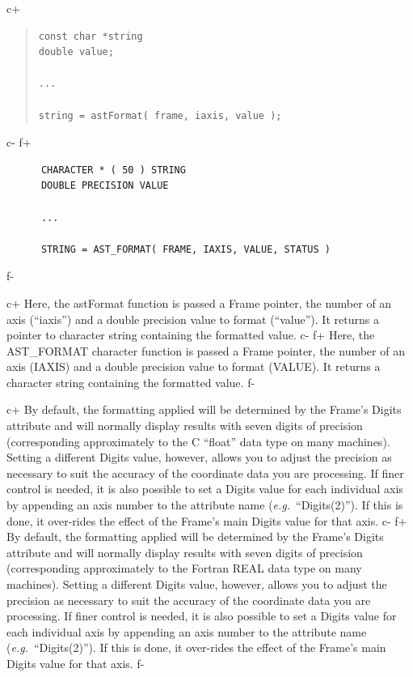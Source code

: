 \documentclass[twoside,11pt]{article}
\begin{document}
c+
\begin{quote}
\small
\begin{verbatim}
const char *string
double value;

...

string = astFormat( frame, iaxis, value );
\end{verbatim}
\normalsize
\end{quote}
c-
f+
\small
\begin{verbatim}
      CHARACTER * ( 50 ) STRING
      DOUBLE PRECISION VALUE

      ...

      STRING = AST_FORMAT( FRAME, IAXIS, VALUE, STATUS )
\end{verbatim}
\normalsize
f-

c+
Here, the astFormat function is passed a Frame pointer, the number of
an axis (``iaxis'') and a double precision value to format
(``value''). It returns a pointer to character string containing the
formatted value.
c-
f+
Here, the AST\_FORMAT character function is passed a Frame pointer,
the number of an axis (IAXIS) and a double precision value to format
(VALUE). It returns a character string containing the formatted value.
f-
\label{ss:formattingwithdigits}

c+
By default, the formatting applied will be determined by the Frame's
Digits attribute and will normally display results with seven digits
of precision (corresponding approximately to the C ``float'' data type
on many machines). Setting a different Digits value, however, allows
you to adjust the precision as necessary to suit the accuracy of the
coordinate data you are processing.  If finer control is needed, it is
also possible to set a Digits value for each individual axis by
appending an axis number to the attribute name
({\em{e.g.}}\ ``Digits(2)''). If this is done, it over-rides the
effect of the Frame's main Digits value for that axis.
c-
f+
By default, the formatting applied will be determined by the Frame's
Digits attribute and will normally display results with seven digits
of precision (corresponding approximately to the Fortran REAL data
type on many machines). Setting a different Digits value, however,
allows you to adjust the precision as necessary to suit the accuracy
of the coordinate data you are processing.  If finer control is
needed, it is also possible to set a Digits value for each individual
axis by appending an axis number to the attribute name
({\em{e.g.}}\ ``Digits(2)''). If this is done, it over-rides the
effect of the Frame's main Digits value for that axis.
f-
\end{document}
